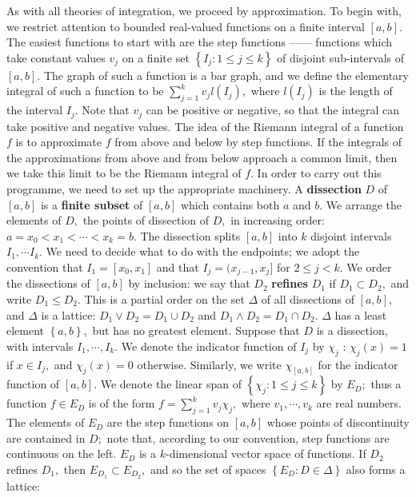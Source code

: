 \documentclass[12pt]{book}
\theoremstyle{definition}\newtheorem{dfn}{Définition}[chapter]
\theoremstyle{plain}\newtheorem{thm}{Théorème}[chapter]
\theoremstyle{plain}\newtheorem{prp}{Proposition}[chapter]
\theoremstyle{plain}\newtheorem{lem}{\bf Lemme}[chapter]
\theoremstyle{plain}\newtheorem{axm}{\bf Axiome}[chapter]
\theoremstyle{plain}\newtheorem{lmm}{\bf Lemme}[chapter]
\theoremstyle{plain}\newtheorem{exm}{\bf Example}[chapter]
\theoremstyle{plain}\newtheorem{cor}{\bf Corollaire}[chapter]
\theoremstyle{remark}\newtheorem{rem}{Remarque}[chapter]
\begin{document}
As with all theories of integration, we proceed by approximation. To
begin with, we restrict attention to bounded real-valued functions on
a finite interval $[a, b].$ The easiest functions to start with are
the step functions —— functions which take constant values $v_j$ on a
finite set $\left\{I_j : 1 \le j \le k\right\}$ of disjoint
sub-intervals of $[a, b].$ The graph of such a function is a bar
graph, and we define the elementary integral of such a function to be
$\sum^k_{j=1} v_jl(I_j),$ where $l(I_j)$ is the length of the interval
$I_j.$ Note that $v_j$ can be positive or negative, so that the
integral can take positive and negative values. The idea of the
Riemann integral of a function $f$ is to approximate $f$ from above
and below by step functions. If the integrals of the approximations
from above and from below approach a common limit, then we take this
limit to be the Riemann integral of $f.$ In order to carry out this
programme, we need to set up the appropriate machinery. A
{\bf{dissection}} $D$ of $[a, b]$ is a {\bf finite subset} of $[a, b]$ which contains both $a$ and $b.$ We arrange the elements of $D,$ the points of dissection of $D,$ in increasing order: $a = x_0 < x_1 < \cdots < x_k = b.$ The dissection splits $[a, b]$ into $k$ disjoint intervals $I_1,\cdots I_k.$ We need to decide what to do with the endpoints; we adopt the convention that $I_1 = [x_0, x_1]$ and that $I_j = (x_{j−1}, x_j ]$ for $2 \le j<k.$
We order the dissections of $[a, b]$ by inclusion: we say that $D_2$ {\bf{refines}} $D_1$ if $D_1 \subset D_2,$ and write $D_1 \le D_2.$ This is a partial order on the set $\Delta$ of all dissections of $[a, b],$ and $\Delta$ is a lattice: $D_1\vee D_2 = D_1 \cup D_2$ and $D_1 \wedge D_2 = D_1 \cap D_2.$ $\Delta$ has a least element $\left\{a, b\right\},$ but has no greatest element.
Suppose that $D$ is a dissection, with intervals $I_1,\cdots,I_k.$ We denote the indicator function of $I_j$ by $\chi_j$ : $\chi_j (x) = 1$ if $x \in I_j,$ and $\chi_j (x) = 0$ otherwise. Similarly, we write $\chi_{[a,b]}$ for the indicator function of $[a, b].$ We denote the linear span of $\left\{\chi_j : 1 \le j \le k\right\}$ by $E_D;$ thus a function $f \in E_D$ is of the form $f =\sum^k _{j=1} v_j\chi_j ,$ where $v_1,\cdots,v_k$ are real numbers. The elements of $E_D$ are the step functions on $[a, b]$ whose points of discontinuity are contained in $D;$ note that, according to our convention, step functions are continuous on the left. $E_D$ is a $k$-dimensional vector space of functions. If $D_2$ refines $D_1,$ then $E_{D_1} \subset E_{D_2},$ and so the set of spaces $\left\{E_D : D \in \Delta\right\}$ also forms a lattice:
\end{document}
